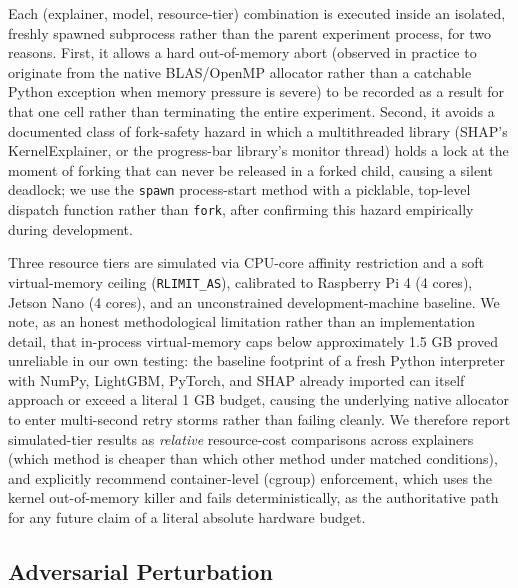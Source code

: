 Each (explainer, model, resource-tier) combination is executed inside an isolated, freshly spawned subprocess rather than the parent experiment process, for two reasons. First, it allows a hard out-of-memory abort (observed in practice to originate from the native BLAS/OpenMP allocator rather than a catchable Python exception when memory pressure is severe) to be recorded as a result for that one cell rather than terminating the entire experiment. Second, it avoids a documented class of fork-safety hazard in which a multithreaded library (SHAP's KernelExplainer, or the progress-bar library's monitor thread) holds a lock at the moment of forking that can never be released in a forked child, causing a silent deadlock; we use the \texttt{spawn} process-start method with a picklable, top-level dispatch function rather than \texttt{fork}, after confirming this hazard empirically during development.

Three resource tiers are simulated via CPU-core affinity restriction and a soft virtual-memory ceiling (\texttt{RLIMIT\_AS}), calibrated to Raspberry Pi 4 (4 cores), Jetson Nano (4 cores), and an unconstrained development-machine baseline. We note, as an honest methodological limitation rather than an implementation detail, that in-process virtual-memory caps below approximately 1.5 GB proved unreliable in our own testing: the baseline footprint of a fresh Python interpreter with NumPy, LightGBM, PyTorch, and SHAP already imported can itself approach or exceed a literal 1 GB budget, causing the underlying native allocator to enter multi-second retry storms rather than failing cleanly. We therefore report simulated-tier results as \emph{relative} resource-cost comparisons across explainers (which method is cheaper than which other method under matched conditions), and explicitly recommend container-level (cgroup) enforcement, which uses the kernel out-of-memory killer and fails deterministically, as the authoritative path for any future claim of a literal absolute hardware budget.

\subsection{Adversarial Perturbation}\label{adversarial-perturbation}

